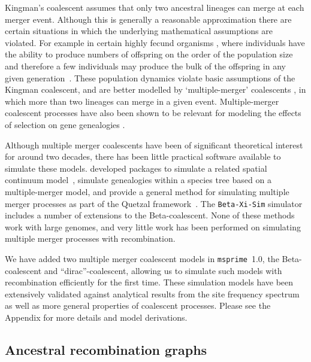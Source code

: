 \documentclass{article}
\newcommand{\msprime}[0]{\texttt{msprime}}
\begin{document}
Kingman's coalescent assumes that only two ancestral lineages can merge at
each merger event. Although this is generally a reasonable approximation there
are certain situations in which the underlying mathematical assumptions are
violated. For example in certain highly fecund organisms
\citep{hedgecock_94,B94,HP11,A04,irwin16}, where individuals have the ability
to produce numbers of offspring on the order of the population size and
therefore a few individuals may produce the bulk of the offspring in any given
generation~\citep{hedgecock_94}. These population dynamics violate basic
assumptions of the Kingman coalescent, and are better modelled by
`multiple-merger' coalescents \citep{DK99,P99,S99,S00,MS01}, in which more than
two lineages can merge in a given event. Multiple-merger coalescent processes
have also been shown to be relevant for modeling the effects of selection on
gene genealogies \citep{Gillespie909,DS04}.

Although multiple merger coalescents have been of significant theoretical
interest for around two decades, there has been little practical software
available to simulate these models.
\cite{kelleher2013coalescent,kelleher2014coalescent} developed packages to
simulate a related spatial continuum model~\citep{barton2010new},
\cite{zhu2015hybrid} simulate genealogies within a species tree
based on a multiple-merger model, and
\cite{becheler2020occupancy} provide a general method for simulating
multiple merger processes
as part of the Quetzal framework~\citep{becheler2019quetzal}.
The \texttt{Beta-Xi-Sim} simulator~\citep{koskela2018multi,koskela2019robust}
includes a number of extensions to the Beta-coalescent.
None of these methods work with large genomes, and very little work
has been performed on simulating multiple merger processes with recombination.

We have added two multiple merger coalescent models in \msprime\ 1.0, the
Beta-coalescent and ``dirac''-coalescent, allowing us to simulate
such models with recombination efficiently for the first time.
These simulation models have been extensively validated against
analytical results from the site frequency
spectrum~\citep{birkner2013statistical,blath2016site,hobolth2019phase}
 as well as more general properties of coalescent processes.
Please see the Appendix for more details and model derivations.


\subsection*{Ancestral recombination graphs}
\end{document}
